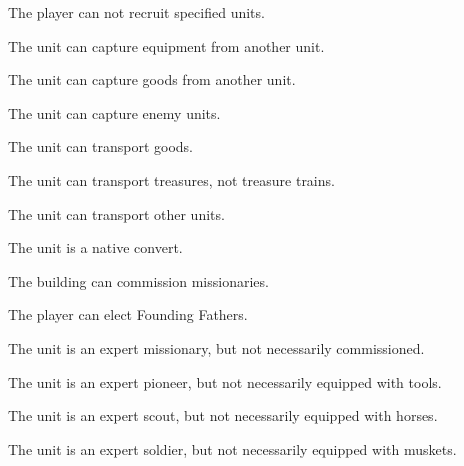 \documentclass[12pt]{book}
\begin{document}
\affectsPlayer

The player can not recruit specified units.

\affectsUnit

The unit can capture equipment from another unit.

\affectsUnit

The unit can capture goods from another unit.

\affectsUnit

The unit can capture enemy units.

\affectsUnit

The unit can transport goods.

\affectsUnit

The unit can transport treasures, not treasure trains.

\affectsUnit

The unit can transport other units.

\affectsUnit

The unit is a native convert.

\affectsBuilding

The building can commission missionaries.

\affectsPlayer

The player can elect Founding Fathers.

\affectsUnit

The unit is an expert missionary, but not necessarily commissioned.

\affectsUnit

The unit is an expert pioneer, but not necessarily equipped with tools.

\affectsUnit

The unit is an expert scout, but not necessarily equipped with horses.

\affectsUnit

The unit is an expert soldier, but not necessarily equipped with muskets.

\affectsPlayer
\end{document}
